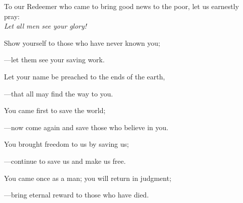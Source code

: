 \intercessions\indent

\begin{hangpar}

To our Redeemer who came to bring good news to the poor, let us earnestly pray:\\
\emph{Let all men see your glory!}

\medskip Show yourself to those who have never known you;

{\color{red}---\thinspace}let them see your saving work.

\medskip Let your name be preached to the ends of the earth,

{\color{red}---\thinspace}that all may find the way to you.

\medskip You came first to save the world;

{\color{red}---\thinspace}now come again and save those who believe in you.

\medskip You brought freedom to us by saving us;

{\color{red}---\thinspace}continue to save us and make us free.

\medskip You came once as a man; you will return in judgment;

{\color{red}---\thinspace}bring eternal reward to those who have died.

\medskip

\end{hangpar}